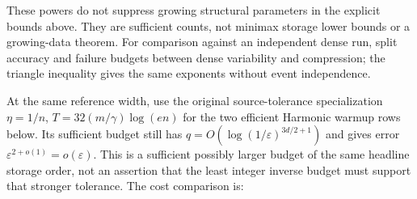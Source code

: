 
These powers do not suppress growing structural parameters in the explicit bounds above. They are sufficient counts, not minimax storage lower bounds or a growing-data theorem. For comparison against an independent dense run, split accuracy and failure budgets between dense variability and compression; the triangle inequality gives the same exponents without event independence.


\label{int:cost-common-consequences}
At the same reference width, use the original source-tolerance specialization \(\eta=1/n\), \(T=32(m/\gamma)\log(en)\) for the two efficient Harmonic warmup rows below. Its sufficient budget still has \(q=O(\log(1/\varepsilon)^{3d/2+1})\) and gives error \(\varepsilon^{2+o(1)}=o(\varepsilon)\). This is a sufficient possibly larger budget of the same headline storage order, not an assertion that the least integer inverse budget must support that stronger tolerance. The cost comparison is:



